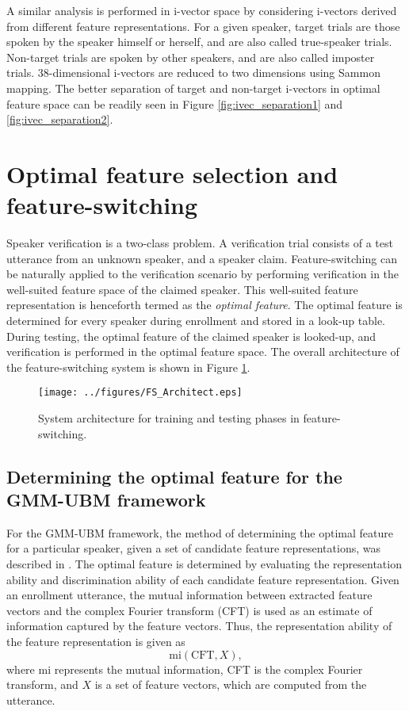 \documentclass[preprint,12pt,5p]{elsarticle}
\begin{document}
A similar analysis is performed in i-vector space by considering i-vectors derived
from different feature representations.  For a given speaker, target trials are
those spoken by the speaker himself or herself, and are also called true-speaker
trials. Non-target trials are spoken by other speakers, and are also called
imposter trials. 38-dimensional i-vectors are reduced
to two dimensions using Sammon mapping. The better separation of target and
non-target i-vectors in optimal feature space can be readily seen in Figure
\ref{fig:ivec_separation1} and \ref{fig:ivec_separation2}.  

\section{Optimal feature selection and feature-switching}
\label{sec:optFeat}
Speaker verification is a two-class problem. A verification trial consists of a
test utterance from an unknown speaker, and a speaker claim. Feature-switching
can be naturally applied to the verification scenario by performing
verification in the well-suited feature space of the claimed speaker. This
well-suited feature representation is henceforth termed as the \emph{optimal
feature}. The optimal feature is determined for every speaker
during enrollment and stored in a look-up table. During testing, the optimal
feature of the claimed speaker is looked-up, and verification is performed in
the optimal feature space. The overall architecture of the feature-switching system 
is shown in Figure \ref{fig:systemArch}. 

\begin{figure}[th]
\centering
\texttt{[image: ../figures/FS\_Architect.eps]}
\caption{System architecture for training and testing phases in feature-switching.}
\label{fig:systemArch}
\end{figure}

\subsection{Determining the optimal feature for the GMM-UBM framework}
\label{subsec:ubm_optFeat}

For the GMM-UBM framework, the method of determining the optimal feature for a
particular speaker, given a set of candidate feature representations, was
described in \cite{padmanInterspeech2010}. The optimal feature is determined by
evaluating the representation ability and discrimination ability
of each candidate feature representation. Given an enrollment utterance, the
mutual information between extracted feature vectors and the complex Fourier
transform (CFT) is used as an estimate of information captured by the feature
vectors. Thus, the representation ability of the feature representation is given
as 
\begin{equation}
\textrm{mi}(\textrm{CFT},X),
\end{equation}
where $\textrm{mi}$ represents the mutual information, CFT is the complex
Fourier transform, and $X$ is a set of feature vectors, which are computed from
the utterance.
\end{document}
